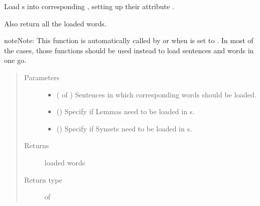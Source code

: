 \documentclass[letterpaper,10pt,english]{sphinxmanual}
\begin{document}

\begin{fulllineitems}
\label{\detokenize{index:loacore.load.word_load.load_words_in_sentences}}
Load  s into corresponding , setting up their attribute .

Also return all the loaded words.

\begin{sphinxadmonition}{note}{Note:}
This function is automatically called by  or
 when  is set to .
In most of the cases, those functions should be used instead to load sentences and words in one go.
\end{sphinxadmonition}
\begin{quote}\begin{description}
\item[{Parameters}] \leavevmode\begin{itemize}
\item {} 
 ( of ) \textendash{} Sentences in which corresponding words should be loaded.

\item {} 
 () \textendash{} Specify if Lemmas need to be loaded in  s.

\item {} 
 () \textendash{} Specify if Synsets need to be loaded in  s.

\end{itemize}

\item[{Returns}] \leavevmode
loaded words

\item[{Return type}] \leavevmode
{} of 

\end{description}\end{quote}

\end{fulllineitems}
\end{document}
